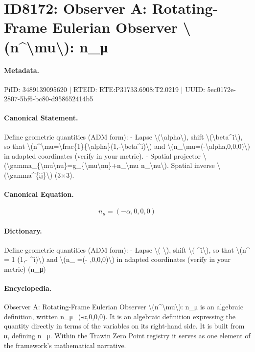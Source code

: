 \section*{ID8172: Observer A: Rotating-Frame Eulerian Observer \textbackslash{}(n\textasciicircum{}\textbackslash{}mu\textbackslash{}): n\_μ}
\paragraph{Metadata.}
PiID: 3489139095620 | RTEID: RTE:P31733.6908:T2.0219 | UUID: 5ec0172e-2807-5bf6-bc80-d958652414b5

\paragraph{Canonical Statement.}
Define geometric quantities (ADM form): - Lapse \textbackslash{}(\textbackslash{}alpha\textbackslash{}), shift \textbackslash{}(\textbackslash{}beta\textasciicircum{}i\textbackslash{}), so that \textbackslash{}(n\textasciicircum{}\textbackslash{}mu=\textbackslash{}frac\{1\}\{\textbackslash{}alpha\}(1,-\textbackslash{}beta\textasciicircum{}i)\textbackslash{}) and \textbackslash{}(n\_\textbackslash{}mu=(-\textbackslash{}alpha,0,0,0)\textbackslash{}) in adapted coordinates (verify in your metric). - Spatial projector \textbackslash{}(\textbackslash{}gamma\_\{\textbackslash{}mu\textbackslash{}nu\}=g\_\{\textbackslash{}mu\textbackslash{}nu\}+n\_\textbackslash{}mu n\_\textbackslash{}nu\textbackslash{}). Spatial inverse \textbackslash{}(\textbackslash{}gamma\textasciicircum{}\{ij\}\textbackslash{}) (3×3).

\paragraph{Canonical Equation.}
\[
n_\mu=(-\alpha,0,0,0)
\]

\paragraph{Dictionary.}
Define geometric quantities (ADM form): - Lapse \textbackslash{}( \textbackslash{}), shift \textbackslash{}( \textasciicircum{}i\textbackslash{}), so that \textbackslash{}(n\textasciicircum{} = 1 (1,- \textasciicircum{}i)\textbackslash{}) and \textbackslash{}(n\_ =(- ,0,0,0)\textbackslash{}) in adapted coordinates (verify in your metric) (n\_μ)

\paragraph{Encyclopedia.}
Observer A: Rotating-Frame Eulerian Observer \textbackslash{}(n\textasciicircum{}\textbackslash{}mu\textbackslash{}): n\_μ is an algebraic definition, written n\_μ=(-α,0,0,0). It is an algebraic definition expressing the quantity directly in terms of the variables on its right-hand side. It is built from α, defining n\_μ. Within the Trawin Zero Point registry it serves as one element of the framework's mathematical narrative.
